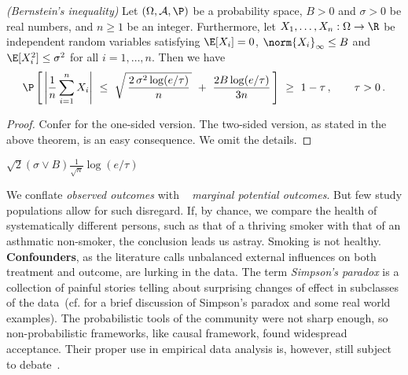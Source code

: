 \begin{theorem}
  \emph{(Bernstein's inequality)}
  Let
  $
  (\Omega,\mathcal{A},\P)
  $ 
  be a probability space, 
  $
  B>0
  $ 
  and
  $
  \sigma>0
  $
  be real numbers,
  and
  $
  n\ge 1
  $
  be an integer.
  Furthermore, 
  let
  $
  X_1,\ldots,X_n
  :
  \Omega
  \to
  \R
  $
  be independent random variables satisfying
  $
  \E[X_i]=0
  $,
  $
  \norm{X_i}_\infty
  \le
  B
  $
  and
  $
  \E[X_i^2]\le \sigma^2
  $
  for all 
  $
  i=1,\ldots,n
  $.
  Then we have
  \begin{gather*}
    \P
    \left[ 
      \,
      \left| 
      \frac{1}{n}
        \sum_{i=1}^{n} 
        X_i
      \right|
      \ 
      \le
      \ 
      \sqrt{
        \,
        \frac{2\,\sigma^2 \log (e/\tau)}{n}
        \,
      }
      \ 
      +
      \
      \frac{2 B \log(e/\tau)}{3n}
      \,
    \right]
    \ 
    \ge
    \ 
    1-\tau
    \,
    ,
    \qquad
    \tau>0\,.
  \end{gather*}
\end{theorem}
\begin{proof}
  Confer \cite[Theorem~6.12]{Steinwart2008}
  for the one-sided version. 
  The two-sided version, as stated in the above theorem, is an easy consequence. We omit the details.
\end{proof}
$
\sqrt{2}(\sigma\lor B)\frac{1}{\sqrt{n}}
\log(e/\tau)
$

We conflate \textit{observed outcomes} 
with
~\textit{
marginal potential outcomes}.
But few study populations allow for such disregard.
If, by chance, we compare the health of 
systematically different persons, such as
that of a thriving smoker with that of an asthmatic non-smoker,
the conclusion leads us astray.
Smoking is not healthy.
\textbf{Confounders}, as the literature calls 
unbalanced external influences
on both treatment and outcome,
are lurking in the data.
The term
\textit{Simpson's paradox} 
is a collection of painful stories telling about surprising changes of effect in subclasses of the data~(cf.\cite{Wagner1982} for a brief discussion of Simpson's paradox and some real world examples).
The probabilistic tools of the community were not sharp enough,
so non-probabilistic frameworks, like causal framework,
found widespread acceptance. 
Their proper use in empirical data analysis is, however, still subject to debate~\cite[§6]{pearl2009causality}.


